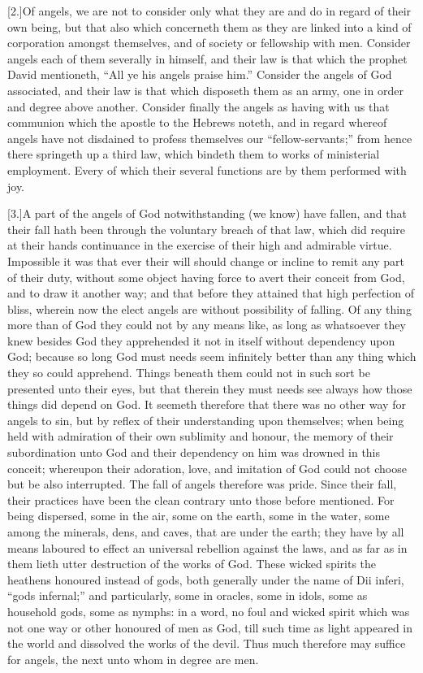 [2.]Of angels, we are not to consider only what they are and do in regard of their own being, but that also which concerneth them as they are linked into a kind of corporation amongst themselves, and of society or fellowship with men. Consider angels each of them severally in himself, and their law is that which the prophet David mentioneth, “All ye his angels praise him.” Consider the angels of God associated, and their law is that which disposeth them as an army, one in order and degree above another. Consider finally the angels as having with us that communion which the apostle to the Hebrews noteth, and in regard whereof  angels have not disdained to profess themselves our “fellow-servants;” from hence there springeth up a third law, which bindeth them to works of ministerial employment. Every of which their several functions are by them performed with joy.

[3.]A part of the angels of God notwithstanding (we know) have fallen, and that their fall hath been through the voluntary breach of that law, which did require at their hands continuance in the exercise of their high and admirable virtue. Impossible it was that ever their will should change or incline to remit any part of their duty, without some object having force to avert their conceit from God, and to draw it another way; and that before they attained that high perfection of bliss, wherein now the elect angels are without possibility of falling. Of any thing more than of God they could not by any means like, as long as whatsoever they knew besides God they apprehended it not in itself without dependency upon God; because so long God must needs seem infinitely better than any thing which they so could apprehend. Things beneath them could not in such sort be presented unto their eyes, but that therein they must needs see always how those things did depend on God. It seemeth therefore that there was no other way for angels to sin, but by reflex of their understanding upon themselves; when being held with admiration of their own sublimity and honour, the memory of their subordination unto God and their dependency on him was drowned in this conceit; whereupon their adoration, love, and imitation of God could not choose but be also interrupted. The fall of angels therefore was pride. Since their fall, their practices have been the clean contrary unto those before mentioned. For being dispersed,  some in the air, some on the earth, some in the water, some among the minerals, dens, and caves, that are under the earth; they have by all means laboured to effect an universal rebellion against the laws, and as far as in them lieth utter destruction of the works of God. These wicked spirits the heathens honoured instead of gods, both generally under the name of Dii inferi, “gods infernal;” and particularly, some in oracles, some in idols, some as household gods, some as nymphs: in a word, no foul and wicked spirit which was not one way or other honoured of men as God, till such time as light appeared in the world and dissolved the works of the devil. Thus much therefore may suffice for angels, the next unto whom in degree are men.

